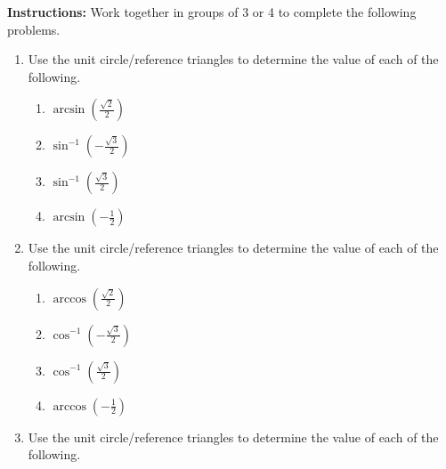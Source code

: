 


\noindent \textbf{Instructions:}  Work together in groups of  3 or 4 to complete the following problems.\\

\begin{enumerate}

\item Use the unit circle/reference triangles to determine the value of each of the following.
\begin{enumerate}
\item $\arcsin \left( \frac{\sqrt{2}}{2}\right)$
\vspace{0.5cm}

\item $\sin^{-1} \left( -\frac{\sqrt{3}}{2}\right)$
\vspace{0.5cm}

\item $\sin^{-1} \left( \frac{\sqrt{3}}{2}\right)$
\vspace{0.5cm}

\item $\arcsin \left( -\frac{1}{2}\right)$
\vspace{0.5cm}
\end{enumerate}


\item Use the unit circle/reference triangles to determine the value of each of the following.
\begin{enumerate}

\item $\arccos \left( \frac{\sqrt{2}}{2}\right)$
\vspace{0.5cm}

\item $\cos^{-1} \left( -\frac{\sqrt{3}}{2}\right)$
\vspace{0.5cm}

\item $\cos^{-1} \left( \frac{\sqrt{3}}{2}\right)$
\vspace{0.5cm}

\item $\arccos \left( -\frac{1}{2}\right)$
\vspace{0.5cm}
\end{enumerate}



\item Use the unit circle/reference triangles to determine the value of each of the following.
\begin{enumerate}


\end{enumerate}
\end{enumerate}

